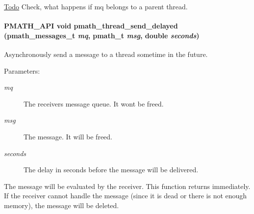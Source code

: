 \begin{Desc}
\item[\hyperlink{todo__todo000002}{Todo}]Check, what happens if mq belongs to a parent thread. \end{Desc}
\hypertarget{group__threadmsg_g75339d9dd1902293cb72b38e77caa742}{
\paragraph[{pmath\_\-thread\_\-send\_\-delayed}]{\setlength{\rightskip}{0pt plus 5cm}PMATH\_\-API void pmath\_\-thread\_\-send\_\-delayed ({\bf pmath\_\-messages\_\-t} {\em mq}, \/  {\bf pmath\_\-t} {\em msg}, \/  double {\em seconds})}\hfill}
\label{group__threadmsg_g75339d9dd1902293cb72b38e77caa742}


Asynchronously send a message to a thread sometime in the future. 

\begin{Desc}
\item[Parameters:]
\begin{description}
\item[{\em mq}]The receivers message queue. It wont be freed. \item[{\em msg}]The message. It will be freed. \item[{\em seconds}]The delay in seconds before the message will be delivered.\end{description}
\end{Desc}
The message will be evaluated by the receiver. This function returns immediately. If the receiver cannot handle the message (since it is dead or there is not enough memory), the message will be deleted. 